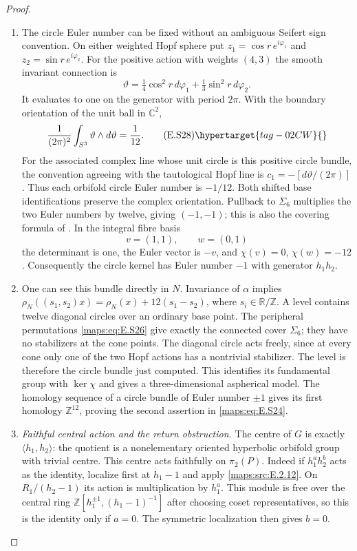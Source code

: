 \begin{proof}
\begin{enumerate}[label={$\langle1\rangle$\arabic*.},leftmargin=*]
\item The circle Euler number can be fixed without an ambiguous
Seifert sign convention. On either weighted Hopf sphere put
$z_1=\cos r\,e^{i\varphi_1}$ and
$z_2=\sin r\,e^{i\varphi_2}$. For the positive action with
weights $(4,3)$ the smooth invariant connection is
\[
 \vartheta=\tfrac14\cos^2r\,d\varphi_1
                    +\tfrac13\sin^2r\,d\varphi_2.
\]
It evaluates to one on the generator with period $2\pi$.
With the boundary orientation of the unit ball in $\mathbb C^2$,
\[
             \frac1{(2\pi)^2}\int_{S^3}\vartheta\wedge d\vartheta
                         =\frac1{12}.
 \tag{E.S28}\hypertarget{tag-02CW}{}\label{maps:eq:E.S28}
\]
For the associated complex line whose unit circle is this
positive circle bundle, the convention agreeing with the
tautological Hopf line is $c_1=-[d\vartheta/(2\pi)]$.
Thus each orbifold circle Euler number is $-1/12$.
Both shifted base identifications preserve the complex
orientation. Pullback to $\Sigma_6$ multiplies the two Euler
numbers by twelve, giving $(-1,-1)$; this is also the
covering formula of \cite[Theorem 3.6]{rootScott83}.
In the integral fibre basis
\[
                  v=(1,1),\qquad w=(0,1)
\]
the determinant is one, the Euler vector is $-v$, and
$\chi(v)=0$, $\chi(w)=-12$. Consequently the circle kernel
has Euler number $-1$ with generator $h_1h_2$.

\item One can see this bundle directly in $N$. Invariance of
$\alpha$ implies
$\rho_N((s_1,s_2)x)=\rho_N(x)+12(s_1-s_2)$, where
$s_i\in\mathbb R/\mathbb Z$. A level contains twelve
diagonal circles over an ordinary base point. The peripheral
permutations \eqref{maps:eq:E.S26} give exactly the connected cover
$\Sigma_6$; they have no stabilizers at the cone points.
The diagonal circle acts freely, since at every cone only
one of the two Hopf actions has a nontrivial stabilizer.
The level is therefore the circle bundle just computed.
This identifies its fundamental group with $\ker\chi$
and gives a three-dimensional aspherical model.
The homology sequence of a circle bundle of Euler number
$\pm1$ gives its first homology $\mathbb Z^{12}$, proving
the second assertion in \eqref{maps:eq:E.S24}.

\item \emph{Faithful central action and the return obstruction.}
The centre of $G$ is exactly $\langle h_1,h_2\rangle$:
the quotient is a nonelementary oriented hyperbolic orbifold
group with trivial centre. This centre acts faithfully on
$\pi_2(P)$. Indeed if $h_1^a h_2^b$ acts as the identity,
localize first at $h_1-1$ and apply \ref{maps:src:E.2.12}. On
$R_1/(h_2-1)$ its action is multiplication by $h_1^a$.
This module is free over the central ring
$\mathbb Z[h_1^{\pm1},(h_1-1)^{-1}]$ after choosing coset
representatives, so this is the identity only if $a=0$.
The symmetric localization then gives $b=0$.


\end{enumerate}
\end{proof}

